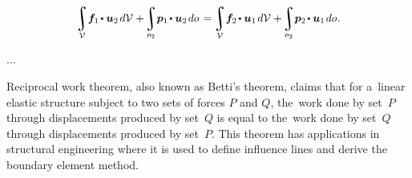 \nopagebreak\vspace{1.3em}\begin{equation}\label{betti:reciprocalworktheorem}
\tikzmark{beginReciprocalFirstVariant} \scalebox{0.98}{$\displaystyle \integral\displaylimits_{\mathcal{V}} \hspace{-0.4ex} \bm{f}_1 \hspace{-0.2ex} \dotp \bm{u}_2 \hspace{.25ex} d\mathcal{V} $}
+ \hspace{-0.3ex}
\scalebox{0.96}{$\displaystyle\integral\displaylimits_{o_2} \hspace{-0.4ex} \bm{p}_1 \hspace{-0.2ex} \dotp \bm{u}_2 \hspace{.25ex} do $} \tikzmark{endReciprocalFirstVariant}
%
\hspace{.2ex} = \hspace{-0.2ex}
%
\tikzmark{beginReciprocalSecondVariant} \scalebox{0.98}{$\displaystyle \integral\displaylimits_{\mathcal{V}} \hspace{-0.4ex} \bm{f}_2 \hspace{-0.2ex} \dotp \bm{u}_1 \hspace{.25ex} d\mathcal{V} $}
+ \hspace{-0.3ex}
 \scalebox{0.96}{$\displaystyle\integral\displaylimits_{o_2} \hspace{-0.4ex} \bm{p}_2 \hspace{-0.2ex} \dotp \bm{u}_1 \hspace{.25ex} do $} \tikzmark{endReciprocalSecondVariant}
\hspace{.1ex} .
\end{equation}%
%

...

{\small
Reciprocal work theorem, also known as Betti’s theorem, claims that for a~linear elastic structure subject to two sets of forces $P$ and $Q$, the~work done by set~$P$ through displacements produced by set~$Q$ is equal to the~work done by set~$Q$ through displacements produced by set~$P$. This theorem has applications in structural engineering where it is used to define influence lines and derive the boundary element method.
\par}

